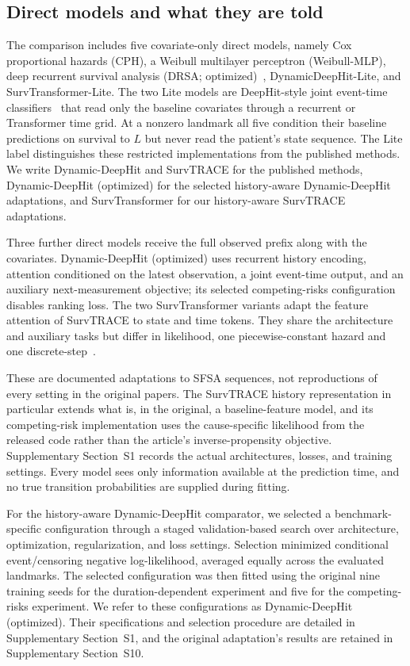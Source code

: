 \subsection{Direct models and what they are told}
The comparison includes five covariate-only direct models, namely Cox proportional hazards (CPH), a Weibull multilayer perceptron (Weibull-MLP), deep recurrent survival analysis (DRSA; optimized)~\citep{ren2019}, DynamicDeepHit-Lite, and SurvTransformer-Lite. The two Lite models are DeepHit-style joint event-time classifiers~\citep{lee2018deephit} that read only the baseline covariates through a recurrent or Transformer time grid. At a nonzero landmark all five condition their baseline predictions on survival to $L$ but never read the patient's state sequence. The Lite label distinguishes these restricted implementations from the published methods. We write Dynamic-DeepHit and SurvTRACE for the published methods, Dynamic-DeepHit (optimized) for the selected history-aware Dynamic-DeepHit adaptations, and SurvTransformer for our history-aware SurvTRACE adaptations.

Three further direct models receive the full observed prefix along with the covariates. Dynamic-DeepHit (optimized) uses recurrent history encoding, attention conditioned on the latest observation, a joint event-time output, and an auxiliary next-measurement objective; its selected competing-risks configuration disables ranking loss. The two SurvTransformer variants adapt the feature attention of SurvTRACE to state and time tokens. They share the architecture and auxiliary tasks but differ in likelihood, one piecewise-constant hazard and one discrete-step~\citep{lee2019dynamic,wang2022survtrace}.

These are documented adaptations to SFSA sequences, not reproductions of every setting in the original papers. The SurvTRACE history representation in particular extends what is, in the original, a baseline-feature model, and its competing-risk implementation uses the cause-specific likelihood from the released code rather than the article's inverse-propensity objective. Supplementary Section~S1 records the actual architectures, losses, and training settings. Every model sees only information available at the prediction time, and no true transition probabilities are supplied during fitting.

For the history-aware Dynamic-DeepHit comparator, we selected a benchmark-specific configuration through a staged validation-based search over architecture, optimization, regularization, and loss settings. Selection minimized conditional event/censoring negative log-likelihood, averaged equally across the evaluated landmarks. The selected configuration was then fitted using the original nine training seeds for the duration-dependent experiment and five for the competing-risks experiment. We refer to these configurations as Dynamic-DeepHit (optimized). Their specifications and selection procedure are detailed in Supplementary Section~S1, and the original adaptation's results are retained in Supplementary Section~S10.

